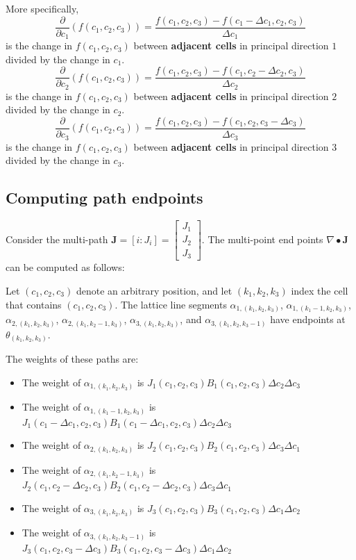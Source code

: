 \documentclass{book}
\begin{document}
More specifically, 
\[\frac{\partial}{\partial c_1}(f(c_1, c_2, c_3)) = \frac{f(c_1, c_2, c_3) - f(c_1 - \Delta c_1, c_2, c_3)}{\Delta c_1}\]
is the change in \(f(c_1, c_2, c_3)\) between {\bf adjacent cells} in principal direction \(1\) divided by the change in \(c_1\).
\[\frac{\partial}{\partial c_2}(f(c_1, c_2, c_3)) = \frac{f(c_1, c_2, c_3) - f(c_1, c_2 - \Delta c_2, c_3)}{\Delta c_2}\]
is the change in \(f(c_1, c_2, c_3)\) between {\bf adjacent cells} in principal direction \(2\) divided by the change in \(c_2\).
\[\frac{\partial}{\partial c_3}(f(c_1, c_2, c_3)) = \frac{f(c_1, c_2, c_3) - f(c_1, c_2, c_3 - \Delta c_3)}{\Delta c_3}\]
is the change in \(f(c_1, c_2, c_3)\) between {\bf adjacent cells} in principal direction \(3\) divided by the change in \(c_3\).




\subsection*{Computing path endpoints}

Consider the multi-path \(\mathbf{J} = [i : J_i] = \begin{bmatrix} J_1 \\ J_2 \\ J_3 \end{bmatrix}\). The multi-point end points \(\nabla \bullet \mathbf{J}\) can be computed as follows:

Let \((c_1, c_2, c_3)\) denote an arbitrary position, and let \((k_1, k_2, k_3)\) index the cell that contains \((c_1, c_2, c_3)\). The lattice line segments \(\alpha_{1,(k_1,k_2,k_3)}\), \(\alpha_{1,(k_1-1,k_2,k_3)}\), \(\alpha_{2,(k_1,k_2,k_3)}\), \(\alpha_{2,(k_1,k_2-1,k_3)}\), \(\alpha_{3,(k_1,k_2,k_3)}\), and \(\alpha_{3,(k_1,k_2,k_3-1)}\) have endpoints at \(\theta_{(k_1, k_2, k_3)}\). 

The weights of these paths are:
\begin{itemize}
\item The weight of \(\alpha_{1,(k_1,k_2,k_3)}\) is \(J_1(c_1,c_2,c_3) B_1(c_1, c_2, c_3) \Delta c_2 \Delta c_3\)
\item The weight of \(\alpha_{1,(k_1-1,k_2,k_3)}\) is \(J_1(c_1 - \Delta c_1,c_2,c_3) B_1(c_1 - \Delta c_1, c_2, c_3) \Delta c_2 \Delta c_3\)
\item The weight of \(\alpha_{2,(k_1,k_2,k_3)}\) is \(J_2(c_1,c_2,c_3) B_2(c_1, c_2, c_3) \Delta c_3 \Delta c_1\)
\item The weight of \(\alpha_{2,(k_1,k_2-1,k_3)}\) is \(J_2(c_1,c_2 - \Delta c_2,c_3) B_2(c_1, c_2 - \Delta c_2, c_3) \Delta c_3 \Delta c_1\)
\item The weight of \(\alpha_{3,(k_1,k_2,k_3)}\) is \(J_3(c_1,c_2,c_3) B_3(c_1, c_2, c_3) \Delta c_1 \Delta c_2\)
\item The weight of \(\alpha_{3,(k_1,k_2,k_3-1)}\) is \(J_3(c_1,c_2,c_3 - \Delta c_3) B_3(c_1, c_2, c_3 - \Delta c_3) \Delta c_1 \Delta c_2\)
\end{itemize}
\end{document}
